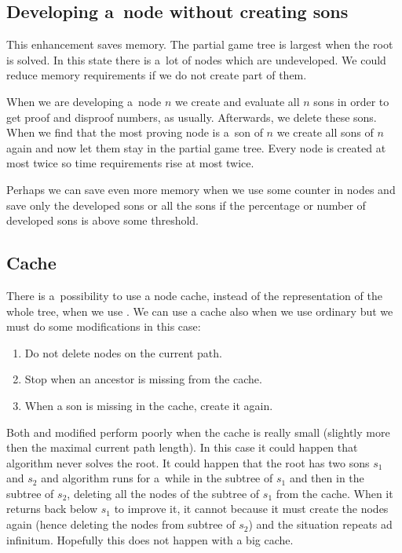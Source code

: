 \subsection{Developing a~node without creating sons} \label{lastenh}

This enhancement saves memory. The partial game tree is largest when the root is
solved. In this state there is a~lot of nodes which are undeveloped.  We could reduce memory requirements if we do not
create part of them. 

When we are developing a~node $n$ we create and evaluate all $n$ sons in order to
get proof and disproof numbers, as usually. Afterwards, we delete these sons. When
we find that the  most proving node is a~son of $n$ we create all sons of $n$ again and
now let them stay in the partial game tree. Every node is created at most twice so
time requirements rise at most twice.  

Perhaps we can save even more memory when we use some counter in nodes
and save only the developed sons or all the sons if the percentage or number 
of developed sons is above some threshold.

\subsection{Cache}

There is a~possibility to use a node cache, instead of the representation of the whole
tree, when we use .
We can use a cache also when we use ordinary  but we must
do some modifications in this case: 

\begin{enumerate}
\item Do not delete nodes on the current path.
\item Stop  when an ancestor is missing from the cache.
\item When a son is missing in the cache, create it again.
\end{enumerate}

Both  and modified  perform poorly when the
cache is really small (slightly more then the maximal current path length). In
this case it could happen that algorithm never solves the root. It could happen
that the root has two sons $s_1$ and $s_2$  and algorithm runs for a~while in
the subtree of $s_1$ and then in the subtree of $s_2$, deleting all the nodes
of the subtree of $s_1$ from the cache. When it returns back below $s_1$ to
improve it, it cannot because it must create the nodes again (hence deleting
the nodes from subtree of $s_2$) and the situation repeats ad infinitum.
Hopefully this does not happen with a big cache.

